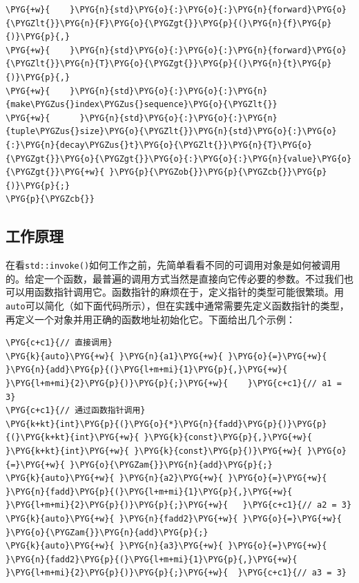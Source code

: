 \begin{codeblockbg}
\begin{Verbatim}[commandchars=\\\{\},breaklines=true,breakanywhere=true,fontsize=\codefont,xleftmargin=17bp]
\PYG{+w}{    }\PYG{n}{std}\PYG{o}{:}\PYG{o}{:}\PYG{n}{forward}\PYG{o}{\PYGZlt{}}\PYG{n}{F}\PYG{o}{\PYGZgt{}}\PYG{p}{(}\PYG{n}{f}\PYG{p}{)}\PYG{p}{,}
\PYG{+w}{    }\PYG{n}{std}\PYG{o}{:}\PYG{o}{:}\PYG{n}{forward}\PYG{o}{\PYGZlt{}}\PYG{n}{T}\PYG{o}{\PYGZgt{}}\PYG{p}{(}\PYG{n}{t}\PYG{p}{)}\PYG{p}{,}
\PYG{+w}{    }\PYG{n}{std}\PYG{o}{:}\PYG{o}{:}\PYG{n}{make\PYGZus{}index\PYGZus{}sequence}\PYG{o}{\PYGZlt{}}
\PYG{+w}{      }\PYG{n}{std}\PYG{o}{:}\PYG{o}{:}\PYG{n}{tuple\PYGZus{}size}\PYG{o}{\PYGZlt{}}\PYG{n}{std}\PYG{o}{:}\PYG{o}{:}\PYG{n}{decay\PYGZus{}t}\PYG{o}{\PYGZlt{}}\PYG{n}{T}\PYG{o}{\PYGZgt{}}\PYG{o}{\PYGZgt{}}\PYG{o}{:}\PYG{o}{:}\PYG{n}{value}\PYG{o}{\PYGZgt{}}\PYG{+w}{ }\PYG{p}{\PYGZob{}}\PYG{p}{\PYGZcb{}}\PYG{p}{)}\PYG{p}{;}
\PYG{p}{\PYGZcb{}}
\end{Verbatim}
\end{codeblockbg}



\subsection{工作原理}



在看\texttt{std::\allowbreak{}invoke()}如何工作之前，先简单看看不同的可调用对象是如何被调用的。给定一个函数，最普遍的调用方式当然是直接向它传必要的参数。不过我们也可以用函数指针调用它。函数指针的麻烦在于，定义指针的类型可能很繁琐。用\texttt{auto}可以简化（如下面代码所示），但在实践中通常需要先定义函数指针的类型，再定义一个对象并用正确的函数地址初始化它。下面给出几个示例：



\begin{codeblockbg}
\begin{Verbatim}[commandchars=\\\{\},breaklines=true,breakanywhere=true,fontsize=\codefont,xleftmargin=17bp]
\PYG{c+c1}{// 直接调用}
\PYG{k}{auto}\PYG{+w}{ }\PYG{n}{a1}\PYG{+w}{ }\PYG{o}{=}\PYG{+w}{ }\PYG{n}{add}\PYG{p}{(}\PYG{l+m+mi}{1}\PYG{p}{,}\PYG{+w}{ }\PYG{l+m+mi}{2}\PYG{p}{)}\PYG{p}{;}\PYG{+w}{    }\PYG{c+c1}{// a1 = 3}
\PYG{c+c1}{// 通过函数指针调用}
\PYG{k+kt}{int}\PYG{p}{(}\PYG{o}{*}\PYG{n}{fadd}\PYG{p}{)}\PYG{p}{(}\PYG{k+kt}{int}\PYG{+w}{ }\PYG{k}{const}\PYG{p}{,}\PYG{+w}{ }\PYG{k+kt}{int}\PYG{+w}{ }\PYG{k}{const}\PYG{p}{)}\PYG{+w}{ }\PYG{o}{=}\PYG{+w}{ }\PYG{o}{\PYGZam{}}\PYG{n}{add}\PYG{p}{;}
\PYG{k}{auto}\PYG{+w}{ }\PYG{n}{a2}\PYG{+w}{ }\PYG{o}{=}\PYG{+w}{ }\PYG{n}{fadd}\PYG{p}{(}\PYG{l+m+mi}{1}\PYG{p}{,}\PYG{+w}{ }\PYG{l+m+mi}{2}\PYG{p}{)}\PYG{p}{;}\PYG{+w}{   }\PYG{c+c1}{// a2 = 3}
\PYG{k}{auto}\PYG{+w}{ }\PYG{n}{fadd2}\PYG{+w}{ }\PYG{o}{=}\PYG{+w}{ }\PYG{o}{\PYGZam{}}\PYG{n}{add}\PYG{p}{;}
\PYG{k}{auto}\PYG{+w}{ }\PYG{n}{a3}\PYG{+w}{ }\PYG{o}{=}\PYG{+w}{ }\PYG{n}{fadd2}\PYG{p}{(}\PYG{l+m+mi}{1}\PYG{p}{,}\PYG{+w}{ }\PYG{l+m+mi}{2}\PYG{p}{)}\PYG{p}{;}\PYG{+w}{  }\PYG{c+c1}{// a3 = 3}
\end{Verbatim}
\end{codeblockbg}


